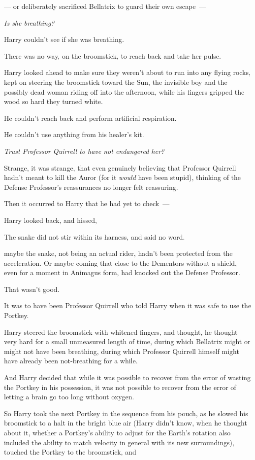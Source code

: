 --- or deliberately sacrificed Bellatrix to guard their own escape~---

\emph{Is she breathing?}

Harry couldn't see if she was breathing.

There was no way, on the broomstick, to reach back and take her pulse.

Harry looked ahead to make sure they weren't about to run into any flying
rocks, kept on steering the broomstick toward the Sun, the invisible boy and
the possibly dead woman riding off into the afternoon, while his fingers
gripped the wood so hard they turned white.

He couldn't reach back and perform artificial respiration.

He couldn't use anything from his healer's kit.

\emph{Trust Professor Quirrell to have not endangered her?}

Strange, it was strange, that even genuinely believing that Professor Quirrell
hadn't meant to kill the Auror (for it \emph{would} have been stupid), thinking
of the Defense Professor's reassurances no longer felt reassuring.

Then it occurred to Harry that he had yet to check~---

Harry looked back, and hissed, 

The snake did not stir within its harness, and said no word.

{\el} maybe the snake, not being an actual rider, hadn't been protected from
the acceleration. Or maybe coming that close to the Dementors without a shield,
even for a moment in Animagus form, had knocked out the Defense Professor.

That wasn't good.

It was to have been Professor Quirrell who told Harry when it was safe to use
the Portkey.

Harry steered the broomstick with whitened fingers, and thought, he thought
very hard for a small unmeasured length of time, during which Bellatrix might
or might not have been breathing, during which Professor Quirrell himself might
have already been not-breathing for a while.

And Harry decided that while it was possible to recover from the error of
wasting the Portkey in his possession, it was not possible to recover from the
error of letting a brain go too long without oxygen.

So Harry took the next Portkey in the sequence from his pouch, as he slowed his
broomstick to a halt in the bright blue air (Harry didn't know, when he thought
about it, whether a Portkey's ability to adjust for the Earth's rotation also
included the ability to match velocity in general with its new surroundings),
touched the Portkey to the broomstick, and{\el}

